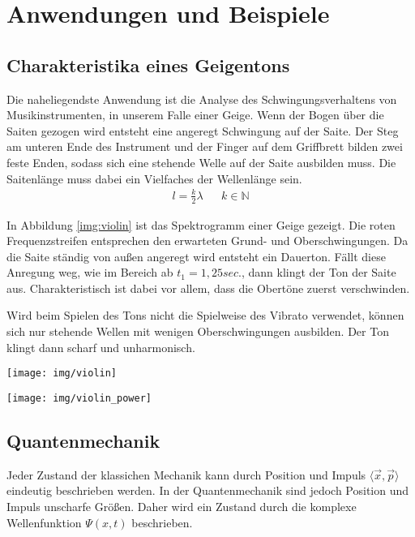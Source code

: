 \section{Anwendungen und Beispiele}

\subsection{Charakteristika eines Geigentons}
Die naheliegendste Anwendung ist die Analyse des Schwingungsverhaltens von Musikinstrumenten, in unserem Falle einer Geige. Wenn der Bogen über die Saiten gezogen wird entsteht eine angeregt Schwingung auf der Saite. Der Steg am unteren Ende des Instrument und der Finger auf dem Griffbrett bilden zwei feste Enden, sodass sich eine stehende Welle auf der Saite ausbilden muss. Die Saitenlänge muss dabei ein Vielfaches der Wellenlänge sein.
\begin{align}
  l = \frac{k}{2} \lambda && k \in \mathbb{N}
\end{align}

In Abbildung \ref{img:violin} ist das Spektrogramm einer Geige gezeigt. Die roten Frequenzstreifen entsprechen den erwarteten Grund- und Oberschwingungen. Da die Saite ständig von au\ss en angeregt wird entsteht ein Dauerton. Fällt diese Anregung weg, wie im Bereich ab $t_1 = 1,25sec.$, dann klingt der Ton der Saite aus. Charakteristisch ist dabei vor allem, dass die Obertöne zuerst verschwinden.

Wird beim Spielen des Tons nicht die Spielweise des Vibrato verwendet, können sich nur stehende Wellen mit wenigen Oberschwingungen ausbilden. Der Ton klingt dann scharf und unharmonisch.

\begin{figure*}
  \centering
  \texttt{[image: img/violin]}
  \caption{Spektrogramm eines Geigentons mit Vibrato. Quelle: (\url{ http://www.maplesoft.com/products/maple/features/Signal_Processing.aspx},  21.11.15)}
  \label{img:violin}
\end{figure*}
\begin{figure*}
  \centering
  \texttt{[image: img/violin\_power]}
  \caption{Frequenzspektrum eines Geigentons mit Vibrato. Quelle: (\url{ http://www.maplesoft.com/products/maple/features/Signal_Processing.aspx},  21.11.15)}
  \label{img:violin_power}
\end{figure*}

\subsection{Quantenmechanik}
Jeder Zustand der klassichen Mechanik kann durch Position und Impuls $ \langle \vec{x}, \vec{p} \rangle $ eindeutig beschrieben werden.
In der Quantenmechanik sind jedoch Position und Impuls unscharfe Grö\ss en. Daher wird ein Zustand durch die komplexe Wellenfunktion $ \Psi(x,t) $ beschrieben.

